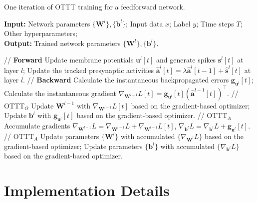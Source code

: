 \documentclass{article}
\begin{document}
\begin{algorithm}[h]
    \caption{One iteration of OTTT training for a feedforward network.}
    \hspace*{0.02in} {\bf Input:}
    Network parameters $\{\mathbf{W}^l\}, \{\mathbf{b}^l\}$; Input data $x$; Label $y$; Time steps $T$; Other hyperparameters;\\
    \hspace*{0.02in} {\bf Output:}
    Trained network parameters $\{\mathbf{W}^l\}, \{\mathbf{b}^l\}$.\\
    \begin{algorithmic}[1]
         \quad // {\bf Forward}
            \State Update membrane potentials $\mathbf{u}^l[t]$ and generate spikes $\mathbf{s}^l[t]$ at layer $l$;
            \State Update the tracked presynaptic activities $\hat{\mathbf{a}}^l[t]=\lambda \hat{\mathbf{a}}^l[t-1]+\hat{\mathbf{s}}^l[t]$ at layer $l$.
        \EndFor
         \quad // {\bf Backward}
            \State Calculate the instantaneous backpropagated errors $\mathbf{g}_{\mathbf{u}^l}[t]$;
            \State Calculate the instantaneous gradient $\nabla_{\mathbf{W}^{l-1}}L[t] = \mathbf{g}_{\mathbf{u}^l}[t](\hat{\mathbf{a}}^{l-1}[t])^\top$.
         \quad // OTTT$_O$
            \State Update $\mathbf{W}^{l-1}$ with $\nabla_{\mathbf{W}^{l-1}}L[t]$ based on the gradient-based optimizer;
            \State Update $\mathbf{b}^{l}$ with $\mathbf{g}_{\mathbf{u}^l}[t]$ based on the gradient-based optimizer.
        \Else \quad // OTTT$_A$
            \State Accumulate gradients $\nabla_{\mathbf{W}^{l-1}}L=\nabla_{\mathbf{W}^{l-1}}L+\nabla_{\mathbf{W}^{l-1}}L[t]$, $\nabla_{\mathbf{b}^{l}}L=\nabla_{\mathbf{b}^{l}}L+\mathbf{g}_{\mathbf{u}^l}[t]$.
        \EndIf
        \EndFor
    \EndFor
     \quad // OTTT$_A$
        \State Update parameters $\{\mathbf{W}^l\}$ with accumulated $\{\nabla_{\mathbf{W}^l}L\}$ based on the gradient-based optimizer;
        \State Update parameters $\{\mathbf{b}^l\}$ with accumulated $\{\nabla_{\mathbf{b}^l}L\}$ based on the gradient-based optimizer.
    \EndIf
    \end{algorithmic}
    \label{algorithm: ottt}
\end{algorithm}

\section{Implementation Details}
\end{document}
